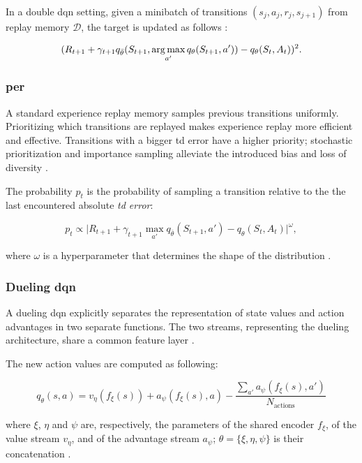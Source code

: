 In a double \acrshort{dqn} setting, given a minibatch of transitions $(s_j, a_j, r_j, s_{j+1})$ from replay memory $\mathcal{D}$, the target is updated as follows \cite{rainbow}:

\begin{equation}
\label{eq:double_dqn}
(R_{t+1} + \gamma_{t+1} q_{\bar\theta}(S_{t+1}, \operatorname*{arg\,max}_{a'} q_\theta(S_{t+1}, a')) - q_\theta(S_t, A_t))^2.    
\end{equation}

\subsubsection{\acrfull{per}}
A standard experience replay memory samples previous transitions uniformly. Prioritizing which transitions are replayed makes experience replay more efficient and effective. Transitions with a bigger \acrfull{td} error have a higher priority; stochastic prioritization and importance sampling alleviate the introduced bias and loss of diversity \cite{prioritized_experience_replay}.

The probability $p_t$ is the probability of sampling a transition relative to the the last encountered absolute \textit{\acrshort{td} error}:

\begin{equation}
\label{eq:per}
    p_t \propto \lvert R_{t+1} + \gamma_{t+1} \max_{a'} q_{\bar\theta}(S_{t+1}, a') - q_\theta(S_t, A_t) \rvert^\omega,
\end{equation}

where $\omega$ is a hyperparameter that determines the shape of the distribution \cite{rainbow}.

\subsubsection{Dueling \acrshort{dqn}}
A dueling \acrshort{dqn} explicitly separates the representation of state values and action advantages in two separate functions. The two streams, representing the dueling architecture, share a common feature layer \cite{dueling_dqn}.

The new action values are computed as following:

\begin{equation}
\label{eq:dueling_dqn}
q_\theta(s, a) = v_\eta (f_\xi(s)) + a_\psi (f_\xi(s), a) - \frac{\sum_{a'} a_\psi(f_\xi(s), a')}{N_{\text{actions}}}
\end{equation}

where $\xi$, $\eta$ and $\psi$ are, respectively, the parameters of the shared encoder $f_\xi$, of the value stream $v_\eta$, and of the advantage stream $a_\psi$; ${ \theta = \{ \xi, \eta, \psi \} }$ is their concatenation \cite{rainbow}.

